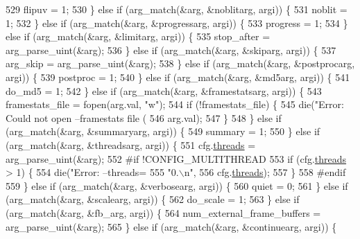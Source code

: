 \begin{DoxyCodeInclude}
{{{{{{{{{{{{{{{{{{{{{{{{{{529       flipuv = 1;
530     \} \textcolor{keywordflow}{else} \textcolor{keywordflow}{if} (arg\_match(&arg, &noblitarg, argi)) \{
531       noblit = 1;
532     \} \textcolor{keywordflow}{else} \textcolor{keywordflow}{if} (arg\_match(&arg, &progressarg, argi)) \{
533       progress = 1;
534     \} \textcolor{keywordflow}{else} \textcolor{keywordflow}{if} (arg\_match(&arg, &limitarg, argi)) \{
535       stop\_after = arg\_parse\_uint(&arg);
536     \} \textcolor{keywordflow}{else} \textcolor{keywordflow}{if} (arg\_match(&arg, &skiparg, argi)) \{
537       arg\_skip = arg\_parse\_uint(&arg);
538     \} \textcolor{keywordflow}{else} \textcolor{keywordflow}{if} (arg\_match(&arg, &postprocarg, argi)) \{
539       postproc = 1;
540     \} \textcolor{keywordflow}{else} \textcolor{keywordflow}{if} (arg\_match(&arg, &md5arg, argi)) \{
541       do\_md5 = 1;
542     \} \textcolor{keywordflow}{else} \textcolor{keywordflow}{if} (arg\_match(&arg, &framestatsarg, argi)) \{
543       framestats\_file = fopen(arg.val, \textcolor{stringliteral}{"w"});
544       \textcolor{keywordflow}{if} (!framestats\_file) \{
545         die(\textcolor{stringliteral}{"Error: Could not open --framestats file (%
546             arg.val);
547       \}
548     \} \textcolor{keywordflow}{else} \textcolor{keywordflow}{if} (arg\_match(&arg, &summaryarg, argi)) \{
549       summary = 1;
550     \} \textcolor{keywordflow}{else} \textcolor{keywordflow}{if} (arg\_match(&arg, &threadsarg, argi)) \{
551       cfg.\hyperlink{structaom__codec__dec__cfg_a48c68337e1071e2aee36c649e579f189}{threads} = arg\_parse\_uint(&arg);
552 \textcolor{preprocessor}{#if !CONFIG\_MULTITHREAD}
553       \textcolor{keywordflow}{if} (cfg.\hyperlink{structaom__codec__dec__cfg_a48c68337e1071e2aee36c649e579f189}{threads} > 1) \{
554         die(\textcolor{stringliteral}{"Error: --threads=%
555             \textcolor{stringliteral}{"0.\(\backslash\)n"},
556             cfg.\hyperlink{structaom__codec__dec__cfg_a48c68337e1071e2aee36c649e579f189}{threads});
557       \}
558 \textcolor{preprocessor}{#endif}
559     \} \textcolor{keywordflow}{else} \textcolor{keywordflow}{if} (arg\_match(&arg, &verbosearg, argi)) \{
560       quiet = 0;
561     \} \textcolor{keywordflow}{else} \textcolor{keywordflow}{if} (arg\_match(&arg, &scalearg, argi)) \{
562       do\_scale = 1;
563     \} \textcolor{keywordflow}{else} \textcolor{keywordflow}{if} (arg\_match(&arg, &fb\_arg, argi)) \{
564       num\_external\_frame\_buffers = arg\_parse\_uint(&arg);
565     \} \textcolor{keywordflow}{else} \textcolor{keywordflow}{if} (arg\_match(&arg, &continuearg, argi)) \{
}}}}}}}}}}}}}}}}}}}}}}}}}}}}
\end{DoxyCodeInclude}
